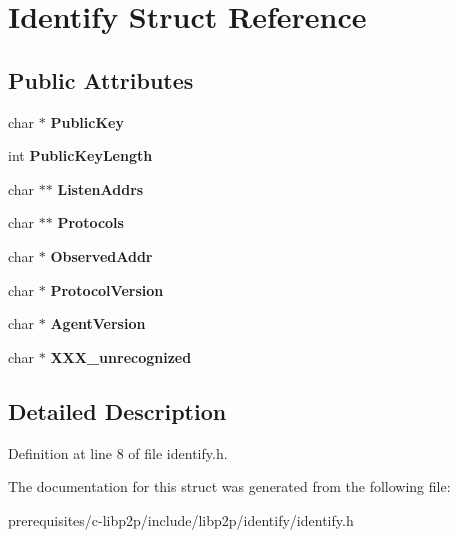 \hypertarget{struct_identify}{}\section{Identify Struct Reference}
\label{struct_identify}
\subsection*{Public Attributes}
\begin{DoxyCompactItemize}
\item 
\mbox{\label{struct_identify_ab337104634416651302a680fdbe569bc}} 
char $\ast$ {\bfseries Public\+Key}
\item 
\mbox{\label{struct_identify_a3cb4abd5e5dbe305fc019916953cb986}} 
int {\bfseries Public\+Key\+Length}
\item 
\mbox{\label{struct_identify_a23bc9d6e17b52ca593d18552a622dda0}} 
char $\ast$$\ast$ {\bfseries Listen\+Addrs}
\item 
\mbox{\label{struct_identify_a4c916d2751fea9851e6c0e4466f7b505}} 
char $\ast$$\ast$ {\bfseries Protocols}
\item 
\mbox{\label{struct_identify_a959476cb34faee862826b330d68a77e9}} 
char $\ast$ {\bfseries Observed\+Addr}
\item 
\mbox{\label{struct_identify_a4c4152c766c5d2edcda7a66a2b1fbb30}} 
char $\ast$ {\bfseries Protocol\+Version}
\item 
\mbox{\label{struct_identify_a5ebfb9b70ef11556f67b9d92e8f3f19d}} 
char $\ast$ {\bfseries Agent\+Version}
\item 
\mbox{\label{struct_identify_a38be3379ac72b0cb17ce4c297a2625d0}} 
char $\ast$ {\bfseries X\+X\+X\+\_\+unrecognized}
\end{DoxyCompactItemize}


\subsection{Detailed Description}


Definition at line 8 of file identify.\+h.



The documentation for this struct was generated from the following file\+:\begin{DoxyCompactItemize}
\item 
prerequisites/c-\/libp2p/include/libp2p/identify/identify.\+h\end{DoxyCompactItemize}
